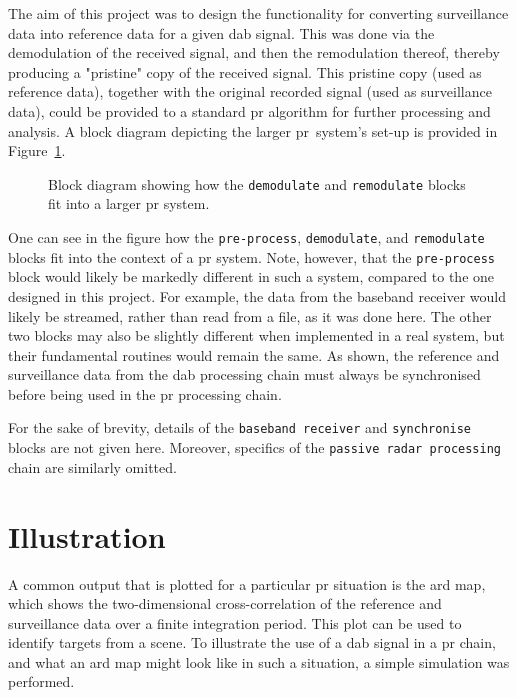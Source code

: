 \documentclass[class=report,11pt,crop=false]{standalone}
\begin{document}
The aim of this project was to design the functionality for converting surveillance data into reference data for a given \gls{dab} signal. This was done via the demodulation of the received signal, and then the remodulation thereof, thereby producing a "pristine" copy of the received signal. This pristine copy (used as reference data), together with the original recorded signal (used as surveillance data), could be provided to a standard \gls{pr} algorithm for further processing and analysis. A block diagram depicting the larger \gls{pr}~system's set-up is provided in Figure~\ref{fig:BD_pr-integration}.
\begin{figure}[htbp]
    \centering
    \captionsetup{type=figure}
    \def\svgwidth{\linewidth}
    { %
    \scriptsize
    }
    \caption{Block diagram showing how the \texttt{demodulate} and \texttt{remodulate} blocks fit into a larger \gls{pr} system.}
    \label{fig:BD_pr-integration}
\end{figure}
One can see in the figure how the \texttt{pre-process}, \texttt{demodulate}, and \texttt{remodulate} blocks fit into the context of a \gls{pr} system. Note, however, that the \texttt{pre-process} block would likely be markedly different in such a system, compared to the one designed in this project. For example, the data from the baseband receiver would likely be streamed, rather than read from a file, as it was done here. The other two blocks may also be slightly different when implemented in a real system, but their fundamental routines would remain the same. As shown, the reference and surveillance data from the \gls{dab} processing chain must always be synchronised before being used in the \gls{pr} processing chain.

For the sake of brevity, details of the \texttt{baseband receiver} and \texttt{synchronise} blocks are not given here. Moreover, specifics of the \texttt{passive radar processing} chain are similarly omitted.

\section{Illustration}
A common output that is plotted for a particular \gls{pr} situation is the \gls{ard} map, which shows the two-dimensional cross-correlation of the reference and surveillance data over a finite integration period. This plot can be used to identify targets from a scene. To illustrate the use of a \gls{dab} signal in a \gls{pr} chain, and what an \gls{ard} map might look like in such a situation, a simple simulation was performed.
\end{document}
